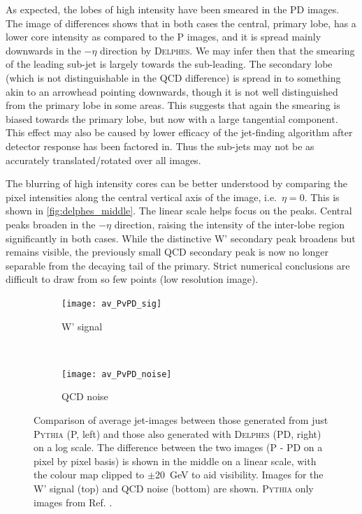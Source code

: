 \documentclass{report}
\newcommand{\pkg}[1]{\textsc{#1}}
\newcommand{\delphes}{\pkg{Delphes}}
\begin{document}
As expected, the lobes of high intensity have been smeared in the PD images. The image of differences shows that in both cases the central, primary lobe, has a lower core intensity as compared to the P images, and it is spread mainly downwards in the $-\eta$ direction by \delphes. We may infer then that the smearing of the leading sub-jet is largely towards the sub-leading. The secondary lobe (which is not distinguishable in the QCD difference) is spread in to something akin to an arrowhead pointing downwards, though it is not well distinguished from the primary lobe in some areas. This suggests that again the smearing is biased towards the primary lobe, but now with a large tangential component. This effect may also be caused by lower efficacy of the jet-finding algorithm after detector response has been factored in. Thus the sub-jets may not be as accurately translated/rotated over all images.

The blurring of high intensity cores can be better understood by comparing the pixel intensities along the central vertical axis of the image, i.e.~$\eta=0$. This is shown in \cref{fig:delphes_middle}. The linear scale helps focus on the peaks. Central peaks broaden in the $-\eta$ direction, raising the intensity of the inter-lobe region significantly in both cases. While the distinctive W' secondary peak broadens but remains visible, the previously small QCD secondary peak is now no longer separable from the decaying tail of the primary. Strict numerical conclusions are difficult to draw from so few points (low resolution image).


  
\begin{figure}[H]
	\centering
	\begin{subfigure}[t]{1.0\linewidth}
		\centering
		\texttt{[image: av\_PvPD\_sig]}
		\caption{W' signal}
	\end{subfigure}%
	\\
	\begin{subfigure}[t]{1.0\linewidth}
		\centering
		\texttt{[image: av\_PvPD\_noise]}
		\caption{QCD noise}
	\end{subfigure}

	\caption{Comparison of average jet-images between those generated from just \pkg{Pythia} (P, left) and those also generated with \pkg{Delphes} (PD, right) on a log scale. The difference between the two images (P - PD on a pixel by pixel basis) is shown in the middle on a linear scale, with the colour map clipped to $\pm$\SI{20}{\giga\electronvolt} to aid visibility. Images for the W' signal (top) and QCD noise (bottom) are shown. \pkg{Pythia} only images from Ref. \cite{de2017learning}. }
	\label{fig:delphes_ims}
\end{figure}
\end{document}
